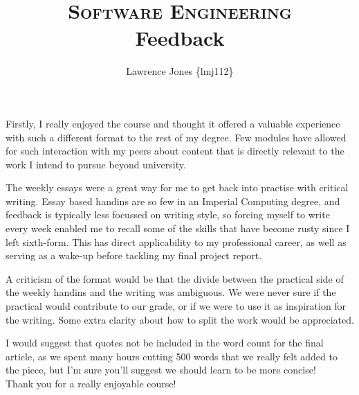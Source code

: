 \documentclass[11pt]{article}
\title{\textsc{Software Engineering}\\Feedback}
\author{Lawrence Jones \{lmj112\}}
\date{}
\begin{document}
\maketitle


Firstly, I really enjoyed the course and thought it offered a valuable
experience with such a different format to the rest of my degree. Few modules
have allowed for such interaction with my peers about content that is directly
relevant to the work I intend to pursue beyond university.

The weekly essays were a great way for me to get back into practise with
critical writing. Essay based handins are so few in an Imperial Computing
degree, and feedback is typically less focussed on writing style, so forcing
myself to write every week enabled me to recall some of the skills that have
become rusty since I left sixth-form. This has direct applicability to my
professional career, as well as serving as a wake-up before tackling my final
project report.

A criticism of the format would be that the divide between the practical side of
the weekly handins and the writing was ambiguous. We were never sure if the
practical would contribute to our grade, or if we were to use it as inspiration
for the writing. Some extra clarity about how to split the work would be
appreciated.

I would suggest that quotes not be included in the word count for the final
article, as we spent many hours cutting 500 words that we really felt added to
the piece, but I'm sure you'll suggest we should learn to be more concise! \\

Thank you for a really enjoyable course!
\end{document}
